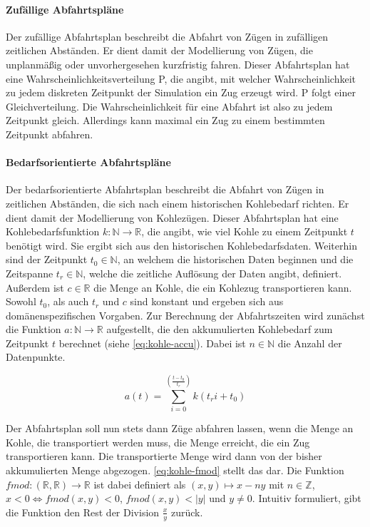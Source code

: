 \paragraph*{Zufällige Abfahrtspläne}

Der zufällige Abfahrtsplan beschreibt die Abfahrt von Zügen in zufälligen zeitlichen Abständen. Er dient damit der Modellierung von Zügen, die unplanmäßig oder unvorhergesehen kurzfristig fahren. Dieser Abfahrtsplan hat eine Wahrscheinlichkeitsverteilung P, die angibt, mit welcher Wahrscheinlichkeit zu jedem diskreten Zeitpunkt der Simulation ein Zug erzeugt wird. P folgt einer Gleichverteilung. Die Wahrscheinlichkeit für eine Abfahrt ist also zu jedem Zeitpunkt gleich. Allerdings kann maximal ein Zug zu einem bestimmten Zeitpunkt abfahren.

\paragraph*{Bedarfsorientierte Abfahrtspläne}

Der bedarfsorientierte Abfahrtsplan beschreibt die Abfahrt von Zügen in zeitlichen Abständen, die sich nach einem historischen Kohlebedarf richten. Er dient damit der Modellierung von Kohlezügen. Dieser Abfahrtsplan hat eine Kohlebedarfsfunktion $k:\mathbb{N}\to\mathbb{R}$, die angibt, wie viel Kohle zu einem Zeitpunkt $t$ benötigt wird. Sie ergibt sich aus den historischen Kohlebedarfsdaten. Weiterhin sind der Zeitpunkt $t_0 \in \mathbb{N}$, an welchem die historischen Daten beginnen und die Zeitspanne $t_r \in \mathbb{N}$, welche die zeitliche Auflösung der Daten angibt, definiert. Außerdem ist $c\in\mathbb{R}$ die Menge an Kohle, die ein Kohlezug transportieren kann.  Sowohl $t_0$, als auch $t_r$ und $c$ sind konstant und ergeben sich aus domänenspezifischen Vorgaben. Zur Berechnung der Abfahrtszeiten wird zunächst die Funktion $a: \mathbb{N} \to \mathbb{R}$ aufgestellt, die den akkumulierten Kohlebedarf zum Zeitpunkt $t$ berechnet (siehe \autoref{eq:kohle-accu}). Dabei ist $n\in\mathbb{N}$ die Anzahl der Datenpunkte.

\begin{equation}
    a(t)=\sum_{i=0}^{\left(\frac{t-t_0}{t_r}\right)} k(t_ri+t_0)\label{eq:kohle-accu}
\end{equation}

Der Abfahrtsplan soll nun stets dann Züge abfahren lassen, wenn die Menge an Kohle, die transportiert werden muss, die Menge erreicht, die ein Zug transportieren kann. Die transportierte Menge wird dann von der bisher akkumulierten Menge abgezogen. \autoref{eq:kohle-fmod} stellt das dar. Die Funktion $fmod:(\mathbb{R},\mathbb{R}) \to \mathbb{R}$ ist dabei definiert als $(x,y)\mapsto x-ny$ mit $n\in\mathbb{Z}$, $x<0\Leftrightarrow fmod(x,y)<0$, $fmod(x,y)<|y|$ und $y\neq 0$. Intuitiv formuliert, gibt die Funktion den Rest der Division $\frac{x}{y}$ zurück.

